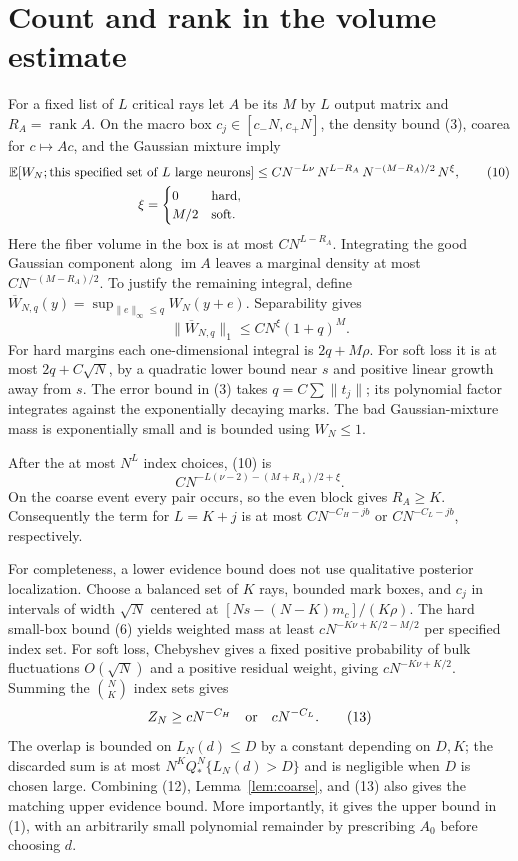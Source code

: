 \documentclass[11pt]{article}
\newcommand{\E}{\mathbb E}\newcommand{\Pp}{\mathbb P}
\begin{document}
\section{Count and rank in the volume estimate}
For a fixed list of $L$ critical rays let $A$ be its $M$ by $L$ output
matrix and $R_A=\operatorname{rank}A$. On the macro box
$c_j\in[c_-N,c_+N]$, the density bound (3), coarea for $c\mapsto Ac$,
and the Gaussian mixture imply
\begin{align}
 &\E[W_N;\hbox{this specified set of $L$ large neurons}]
 \le C N^{-L\nu}\,N^{L-R_A}\,N^{-(M-R_A)/2}\,N^\xi,\tag{10}\\
 &\hspace{35mm}\xi=\begin{cases}0&\text{hard},\\M/2&\text{soft}.\end{cases}\notag
\end{align}
Here the fiber volume in the box is at most $CN^{L-R_A}$. Integrating
the good Gaussian component along $\operatorname{im}A$ leaves a marginal
density at most $CN^{-(M-R_A)/2}$. To justify the remaining integral,
define $\overline W_{N,q}(y)=\sup_{\|e\|_\infty\le q}W_N(y+e)$.
Separability gives
\[
 \|\overline W_{N,q}\|_1\le C N^\xi(1+q)^M.             \tag{11}
\]
For hard margins each one-dimensional integral is $2q+M\rho$.
For soft loss it is at most $2q+C\sqrt N$, by a quadratic lower bound
near $s$ and positive linear growth away from $s$. The error bound in
(3) takes $q=C\sum\|t_j\|$; its polynomial factor integrates against
the exponentially decaying marks. The bad Gaussian-mixture mass is
exponentially small and is bounded using $W_N\le1$.

After the at most $N^L$ index choices, (10) is
\[
                       C N^{-L(\nu-2)-(M+R_A)/2+\xi}.   \tag{12}
\]
On the coarse event every pair occurs, so the even block gives $R_A\ge K$.
Consequently the term for $L=K+j$ is at most
$CN^{-C_H-jb}$ or $CN^{-C_L-jb}$, respectively.

For completeness, a lower evidence bound does not use qualitative
posterior localization. Choose a balanced set of $K$ rays, bounded mark
boxes, and $c_j$ in intervals of width $\sqrt N$ centered at
$[Ns-(N-K)m_c]/(K\rho)$. The hard small-box bound (6) yields weighted
mass at least $cN^{-K\nu+K/2-M/2}$ per specified index set. For soft
loss, Chebyshev gives a fixed positive probability of bulk fluctuations
$O(\sqrt N)$ and a positive residual weight, giving
$cN^{-K\nu+K/2}$. Summing the $\binom NK$ index sets gives
\[
                     Z_N\ge cN^{-C_H}\quad\hbox{or}\quad cN^{-C_L}. \tag{13}
\]
The overlap is bounded on $L_N(d)\le D$ by a constant depending on $D,K$;
the discarded sum is at most $N^K Q_*^N\{L_N(d)>D\}$ and is negligible
when $D$ is chosen large. Combining (12), Lemma~\ref{lem:coarse}, and
(13) also gives the matching upper evidence bound. More importantly,
it gives the upper bound in (1), with an arbitrarily small polynomial
remainder by prescribing $A_0$ before choosing $d$.
\end{document}
